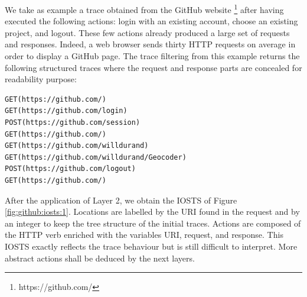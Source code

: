\begin{example}
We take as example a trace obtained from the GitHub website
\footnote{https://github.com/} after having executed the
following actions: login with an existing account, choose an
existing project, and logout. These few actions already produced
a large set of requests and responses. Indeed, a web browser
sends thirty HTTP requests on average in order to display a
GitHub page. The trace filtering from this example returns the
following structured traces where the request and response parts
are concealed for readability purpose:

\begin{lstlisting}
GET(https://github.com/)
GET(https://github.com/login)
POST(https://github.com/session)
GET(https://github.com/)
GET(https://github.com/willdurand)
GET(https://github.com/willdurand/Geocoder)
POST(https://github.com/logout)
GET(https://github.com/)
\end{lstlisting}

After the application of Layer 2, we obtain the IOSTS of Figure
\ref{fig:github:iosts:1}. Locations are labelled by the URI found
in the request and by an integer to keep the tree structure of
the initial traces. Actions are composed of the HTTP verb enriched
with the variables URI, request, and response. This IOSTS exactly
reflects the trace behaviour but is still difficult to interpret.
More abstract actions shall be deduced by the next layers.
\end{example}


